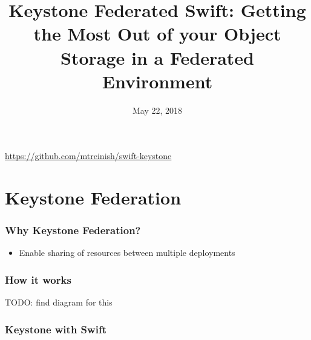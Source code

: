 \documentclass[aspectratio=169,11pt,hyperref={colorlinks=true}]{beamer}
\author[Matthew Treinish & Matthew Oliver]{%
    \texorpdfstring{%
        \begin{columns}
            \column{.45\linewidth}
            \centering
            Matthew Treinish\\
            Developer Advocate - IBM\\
            \href{mailto:mtreinish@kortar.org}{mtreinish@kortar.org}\\
        \texttt{mtreinish on Freenode}
        \column{.45\linewidth}
            \centering
            Matthew Oliver\\
            Senior Software Engineer - SUSE\\
            \href{mailto:matt@oliver.net.au}{matt@oliver.net.au}\\
            \texttt{mattoliverau on Freenode}
        \end{columns}
        }
    {Matthew Treinish & Matthew Oliver}
}
\date{May 22, 2018}
\title[Keystone Federated Swift: Getting the Most Out of your Object Storage in a Federated Environment
\hspace{2em}\insertframenumber/\inserttotalframenumber]{Keystone Federated Swift: Getting the Most Out of your Object Storage in a Federated Environment}
\begin{document}
{%
\begin{frame}[noframenumbering]
    \hypersetup{colorlinks,urlcolor=white}
    \titlepage{}
    \centering
    \href{https://github.com/mtreinish/swift-keystone}{https://github.com/mtreinish/swift-keystone}
\end{frame}
}

\section{Keystone Federation}
\begin{frame}
    \frametitle{Why Keystone Federation?}
    \begin{itemize}
        \item Enable sharing of resources between multiple deployments
    \end{itemize}
\end{frame}

\begin{frame}
\frametitle{How it works}
    TODO: find diagram for this
\end{frame}

\begin{frame}
    \frametitle{Keystone with Swift}
\end{frame}
\end{document}

